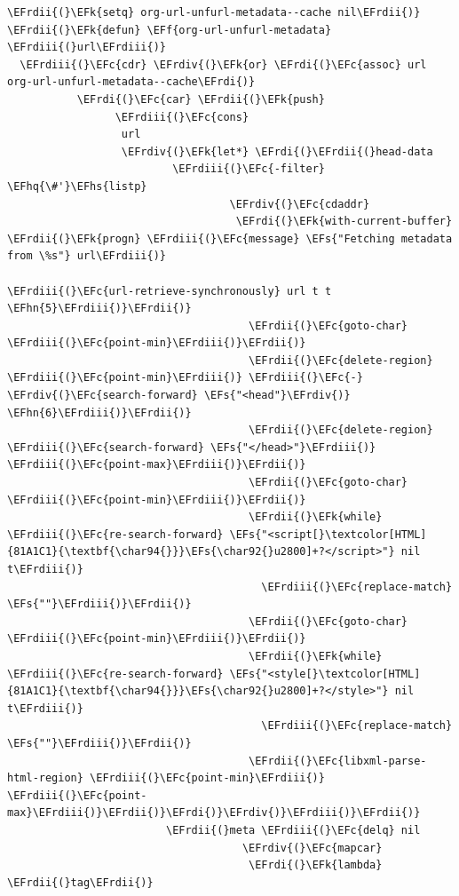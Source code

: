 \documentclass{scrartcl}
\newcommand{\EFk}[1]{\textcolor{EFk}{#1}} %
\newcommand{\EFs}[1]{\textcolor{EFs}{#1}} %
\newcommand{\EFc}[1]{\textcolor{EFc}{#1}} %
\newcommand{\EFf}[1]{\textcolor{EFf}{#1}} %
\newcommand{\EFhn}[1]{#1} %
\newcommand{\EFhq}[1]{#1} %
\newcommand{\EFhs}[1]{#1} %
\newcommand{\EFrdi}[1]{#1} %
\newcommand{\EFrdii}[1]{#1} %
\newcommand{\EFrdiii}[1]{#1} %
\newcommand{\EFrdiv}[1]{#1} %
\begin{document}
\begin{Code}
\begin{Verbatim}[]
\EFrdii{(}\EFk{setq} org-url-unfurl-metadata--cache nil\EFrdii{)}
\EFrdii{(}\EFk{defun} \EFf{org-url-unfurl-metadata} \EFrdiii{(}url\EFrdiii{)}
  \EFrdiii{(}\EFc{cdr} \EFrdiv{(}\EFk{or} \EFrdi{(}\EFc{assoc} url org-url-unfurl-metadata--cache\EFrdi{)}
           \EFrdi{(}\EFc{car} \EFrdii{(}\EFk{push}
                 \EFrdiii{(}\EFc{cons}
                  url
                  \EFrdiv{(}\EFk{let*} \EFrdi{(}\EFrdii{(}head-data
                          \EFrdiii{(}\EFc{-filter} \EFhq{\#'}\EFhs{listp}
                                   \EFrdiv{(}\EFc{cdaddr}
                                    \EFrdi{(}\EFk{with-current-buffer} \EFrdii{(}\EFk{progn} \EFrdiii{(}\EFc{message} \EFs{"Fetching metadata from \%s"} url\EFrdiii{)}
                                                                \EFrdiii{(}\EFc{url-retrieve-synchronously} url t t \EFhn{5}\EFrdiii{)}\EFrdii{)}
                                      \EFrdii{(}\EFc{goto-char} \EFrdiii{(}\EFc{point-min}\EFrdiii{)}\EFrdii{)}
                                      \EFrdii{(}\EFc{delete-region} \EFrdiii{(}\EFc{point-min}\EFrdiii{)} \EFrdiii{(}\EFc{-} \EFrdiv{(}\EFc{search-forward} \EFs{"<head"}\EFrdiv{)} \EFhn{6}\EFrdiii{)}\EFrdii{)}
                                      \EFrdii{(}\EFc{delete-region} \EFrdiii{(}\EFc{search-forward} \EFs{"</head>"}\EFrdiii{)} \EFrdiii{(}\EFc{point-max}\EFrdiii{)}\EFrdii{)}
                                      \EFrdii{(}\EFc{goto-char} \EFrdiii{(}\EFc{point-min}\EFrdiii{)}\EFrdii{)}
                                      \EFrdii{(}\EFk{while} \EFrdiii{(}\EFc{re-search-forward} \EFs{"<script[}\textcolor[HTML]{81A1C1}{\textbf{\char94{}}}\EFs{\char92{}u2800]+?</script>"} nil t\EFrdiii{)}
                                        \EFrdiii{(}\EFc{replace-match} \EFs{""}\EFrdiii{)}\EFrdii{)}
                                      \EFrdii{(}\EFc{goto-char} \EFrdiii{(}\EFc{point-min}\EFrdiii{)}\EFrdii{)}
                                      \EFrdii{(}\EFk{while} \EFrdiii{(}\EFc{re-search-forward} \EFs{"<style[}\textcolor[HTML]{81A1C1}{\textbf{\char94{}}}\EFs{\char92{}u2800]+?</style>"} nil t\EFrdiii{)}
                                        \EFrdiii{(}\EFc{replace-match} \EFs{""}\EFrdiii{)}\EFrdii{)}
                                      \EFrdii{(}\EFc{libxml-parse-html-region} \EFrdiii{(}\EFc{point-min}\EFrdiii{)} \EFrdiii{(}\EFc{point-max}\EFrdiii{)}\EFrdii{)}\EFrdi{)}\EFrdiv{)}\EFrdiii{)}\EFrdii{)}
                         \EFrdii{(}meta \EFrdiii{(}\EFc{delq} nil
                                     \EFrdiv{(}\EFc{mapcar}
                                      \EFrdi{(}\EFk{lambda} \EFrdii{(}tag\EFrdii{)}

\end{Verbatim}
\end{Code}
\end{document}
